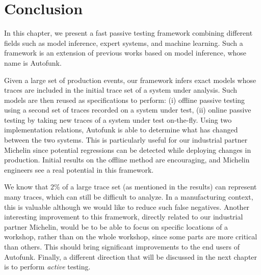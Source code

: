 \section{Conclusion}
\label{sec:testing:conclusion}

In this chapter, we present a fast passive testing framework
combining different fields such as model inference, expert
systems, and machine learning. Such a framework is an extension
of previous works based on model inference, whose name is
Autofunk.

Given a large set of production events, our framework infers
exact models whose traces are included in the initial trace set
of a system under analysis. Such models are then reused as
specifications to perform: (i) offline passive testing using a
second set of traces recorded on a system under test, (ii) online
passive testing by taking new traces of a system under test
on-the-fly.
Using two implementation relations, Autofunk is able to determine
what has changed between the two systems. This is particularly
useful for our industrial partner Michelin since potential
regressions can be detected while deploying changes in
production. Initial results on the offline method are
encouraging, and Michelin engineers see a real potential in this
framework.

We know that 2\% of a large trace set (as mentioned in the
results) can represent many traces, which can still be difficult
to analyze. In a manufacturing context, this is valuable although
we would like to reduce such false negatives.
Another interesting improvement to this framework, directly
related to our industrial partner Michelin, would be to be able
to focus on specific locations of a workshop, rather than on the
whole workshop, since some parts are more critical than others.
This should bring significant improvements to the end users of
Autofunk. Finally, a different direction that will be discussed
in the next chapter is to perform \textit{active} testing.
